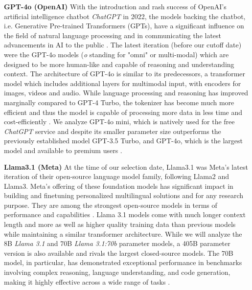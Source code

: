 \par \textbf{GPT-4o (OpenAI)} With the introduction and rash success of OpenAI's artificial intelligence chatbot \textit{ChatGPT} in 2022, the models backing the chatbot, i.e. Generative Pre-trained Transformers (GPTs), have a significant influence on the field of natural language processing and in communicating the latest advancements in AI to the public \parencite{zhao2023survey}. The latest iteration (before our cutoff date) were the GPT-4o models (\textit{o} standing for "omni" or multi-modal) which are designed to be more human-like and capable of reasoning and understanding context. The architecture of GPT-4o is similar to its predecessors, a transformer model which includes additional layers for multimodal input, with encoders for images, videos and audio. While language processing and reasoning has improved marginally compared to GPT-4 Turbo, the tokenizer has become much more efficient and thus the model is capable of processing more data in less time and cost-efficiently \parencite{achiam2023gpt, openai2024gpt4o}. We analyze GPT-4o mini, which is natively used for the free \textit{ChatGPT} service and despite its smaller parameter size outperforms the previously established model GPT-3.5 Turbo, and GPT-4o, which is the largest model and available to premium users \parencite{openai2024gpt4omini}.

\par \textbf{Llama3.1 (Meta)} At the time of our selection date, Llama3.1 was Meta's latest iteration of their open-source language model family, following Llama2 and Llama3. Meta's offering of these foundation models has significant impact in building and finetuning personalized multilingual solutions and for any research purpose. They are among the strongest open-source models in terms of performance and capabilities \parencite{meta2024llama31}. Llama 3.1 models come with much longer context length and more as well as higher quality training data than previous models while maintaining a similar transformer architecture. While we will analyze the 8B \textit{Llama 3.1} and 70B \textit{Llama 3.1:70b} parameter models, a 405B parameter version is also available and rivals the largest closed-source models. The 70B model, in particular, has demonstrated exceptional performance in benchmarks involving complex reasoning, language understanding, and code generation, making it highly effective across a wide range of tasks \parencite{dubey2024llama,meta2024llama31}.

